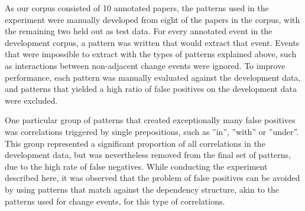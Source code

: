 As our corpus consisted of 10 annotated papers, the patterns used in the experiment were manually developed from eight of the papers in the corpus, with the remaining two held out as test data. For every annotated event in the development corpus, a pattern was written that would extract that event. Events that were impossible to extract with the types of patterns explained above, such as interactions between non-adjacent change events were ignored. To improve performance, each pattern was manually evaluated against the development data, and patterns that yielded a high ratio of false positives on the development data were excluded. 

One particular group of patterns that created exceptionally many false positives was correlations triggered by single prepositions, such as ''in'', ''with'' or ''under''. This group represented a significant proportion of all correlations in the development data, but was nevertheless removed from the final set of patterns, due to the high rate of false negatives. While conducting the experiment described here, it was observed that the problem of false positives can be avoided by using patterns that match against the dependency structure, akin to the patterns used for change events, for this type of correlations.
